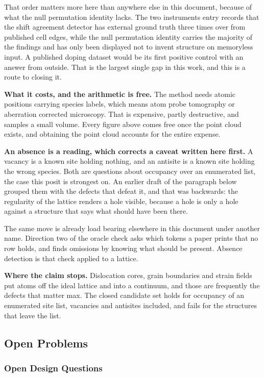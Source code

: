 That order matters more here than anywhere else in this document, because of what the null permutation identity lacks. The two instruments entry records that the shift agreement detector has external ground truth three times over from published cell edges, while the null permutation identity carries the majority of the findings and has only been displayed not to invent structure on memoryless input. A published doping dataset would be its first positive control with an answer from outside. That is the largest single gap in this work, and this is a route to closing it.

\textbf{What it costs, and the arithmetic is free.} The method needs atomic positions carrying species labels, which means atom probe tomography or aberration corrected microscopy. That is expensive, partly destructive, and samples a small volume. Every figure above comes free once the point cloud exists, and obtaining the point cloud accounts for the entire expense.

\textbf{An absence is a reading, which corrects a caveat written here first.} A vacancy is a known site holding nothing, and an antisite is a known site holding the wrong species. Both are questions about occupancy over an enumerated list, the case this posit is strongest on. An earlier draft of the paragraph below grouped them with the defects that defeat it, and that was backwards: the regularity of the lattice renders a hole visible, because a hole is only a hole against a structure that says what should have been there.

The same move is already load bearing elsewhere in this document under another name. Direction two of the oracle check asks which tokens a paper prints that no row holds, and finds omissions by knowing what should be present. Absence detection is that check applied to a lattice.

\textbf{Where the claim stops.} Dislocation cores, grain boundaries and strain fields put atoms off the ideal lattice and into a continuum, and those are frequently the defects that matter max. The closed candidate set holds for occupancy of an enumerated site list, vacancies and antisites included, and fails for the structures that leave the list.

\subsection{Open Problems}

\subsubsection{Open Design Questions}

